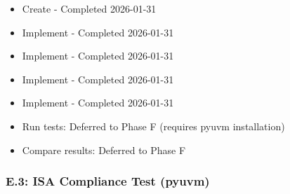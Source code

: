 \begin{record}

\begin{itemize}
\tightlist
\item[$\boxtimes$]
  Create  - Completed 2026-01-31
\item[$\boxtimes$]
  Implement  - Completed 2026-01-31
\item[$\boxtimes$]
  Implement  - Completed 2026-01-31
\item[$\boxtimes$]
  Implement  - Completed 2026-01-31
\item[$\boxtimes$]
  Implement  - Completed 2026-01-31
\item[$\boxtimes$]
  Run tests: Deferred to Phase F (requires pyuvm installation)
\item[$\boxtimes$]
  Compare results: Deferred to Phase F
\end{itemize}

\end{record}

\subsubsection{E.3: ISA Compliance Test (pyuvm)}\label{cr:status:pyuvm-migration:e3-isa-compliance-test-pyuvm}

